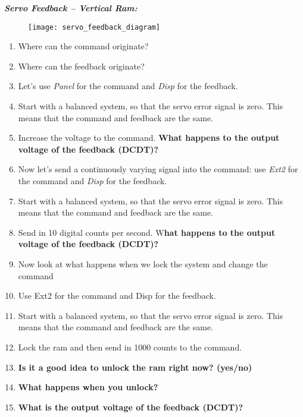 \documentclass[10pt]{article}
\begin{document}
\noindent\textbf{\textit{Servo Feedback -- Vertical Ram:}}
\begin{multicols}{2}
	
	\begin{figure}[H]
		\centering
		\texttt{[image: servo\_feedback\_diagram]}
		\label{fig:servo_fdbk}
	\end{figure}
	
	\begin{enumerate}
		\item Where can the command originate?
		\item Where can the feedback originate?
		\item Let’s use \textit{Panel} for the command and \textit{Disp} for the feedback.
		\item Start with a balanced system, so that the servo error signal is zero.  This means that the command and feedback are the same.
		\item Increase the voltage to the command.
\textbf{What happens to the output voltage of the feedback (DCDT)?} \vspace{15pt}
		\item Now let’s send a continuously varying signal into the command: use \textit{Ext2} for the command and \textit{Disp} for the feedback.
		\item Start with a balanced system, so that the servo error signal is zero.  This means that the command and feedback are the same.
		\item Send in 10 digital counts per second.	W\textbf{hat happens to the output voltage of the feedback (DCDT)?} \vspace{15pt}
		\item Now look at what happens when we lock the system and change the command
		\item Use Ext2 for the command and Disp for the feedback.
		\item Start with a balanced system, so that the servo error signal is zero. This means that the command and feedback are the same.
		\item Lock the ram and then send in 1000 counts to the command.
		\item \textbf{Is it a good idea to unlock the ram right now? (yes/no)} \vspace{15pt}
		\item \textbf{What happens when you unlock?} \vspace{15pt}
		\item \textbf{What is the output voltage of the feedback (DCDT)? }\vspace{15pt}
	\end{enumerate}
\end{multicols}
\end{document}
